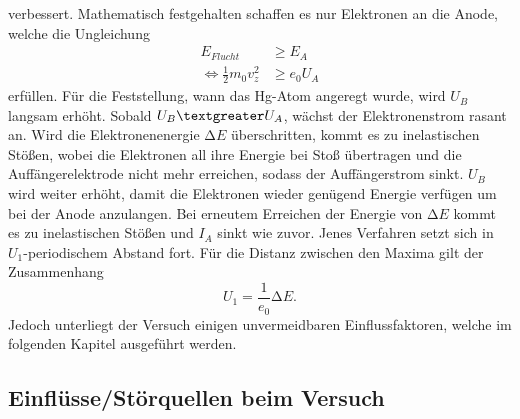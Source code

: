 verbessert. Mathematisch festgehalten schaffen es nur Elektronen an die 
Anode, welche die Ungleichung 
\begin{align}
                                    E_{Flucht} &\geq E_{A} \\
    \Longleftrightarrow \frac{1}{2} m_0 v_z ^2 &\geq e_0 U_A
\end{align}
erfüllen. Für die Feststellung, wann das Hg-Atom angeregt wurde, wird $U_B$ 
langsam erhöht. Sobald $U_B \textgreater U_A$, wächst der Elektronenstrom rasant 
an. Wird die Elektronenenergie $\increment E$ überschritten, kommt es zu inelastischen 
Stößen, wobei die Elektronen all ihre Energie bei Stoß übertragen und die 
Auffängerelektrode nicht mehr erreichen, sodass der Auffängerstrom sinkt. 
$U_B$ wird weiter erhöht, damit die Elektronen wieder genügend Energie verfügen 
um bei der Anode anzulangen. Bei erneutem Erreichen der Energie von $\increment E$
kommt es zu inelastischen Stößen und $I_A$ sinkt wie zuvor. Jenes Verfahren 
setzt sich in $U_{1}$-periodischem Abstand fort. Für die Distanz zwischen den 
Maxima gilt der Zusammenhang
\begin{equation}
    U_1 = \frac{1}{e_0} \increment E.
\end{equation}
\noindent Jedoch unterliegt der Versuch einigen unvermeidbaren Einflussfaktoren, 
welche im folgenden Kapitel ausgeführt werden.

\subsection{Einflüsse/Störquellen beim Versuch}
